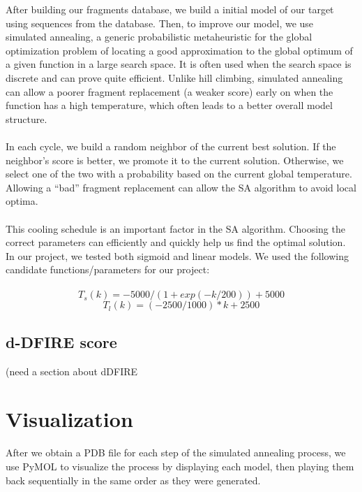 \documentclass{article}
\begin{document}
\begin{enumerate}
After building our fragments database, we build a initial model of our target using sequences from the database. Then, to improve our model, we use simulated annealing, a generic probabilistic metaheuristic for the global optimization problem of locating a good approximation to the global optimum of a given function in a large search space. It is often used when the search space is discrete and can prove quite efficient. Unlike hill climbing, simulated annealing can allow a poorer fragment replacement (a weaker score) early on when the function has a high temperature, which often leads to a better overall model structure. \\\\
In each cycle, we build a random neighbor of the current best solution. If the neighbor’s score is better, we promote it to  the current solution. Otherwise, we select one of the two with a probability based on the current global temperature.  Allowing a “bad” fragment replacement can allow the SA algorithm to avoid local optima.  \\\\
     This cooling schedule is an important factor in the SA algorithm. Choosing the correct parameters can efficiently and quickly help us find the optimal solution. In our project, we tested both sigmoid and linear models. We used the following candidate functions/parameters for our project:\\\\
\begin{equation*}
      T_s(k) =  -5000/(1+ exp(-k/200))+5000
    \end{equation*}
\begin{equation*}
      T_l(k) =  (-2500/1000)*k + 2500
    \end{equation*}



\subsection{d-DFIRE score}

(need a section about dDFIRE

\newpage
\section{Visualization}

After we obtain a PDB file for each step of the simulated annealing process, we use PyMOL to visualize the process by displaying each model, then playing them back sequentially in the same order as they were generated.


\end{enumerate}
\end{document}
